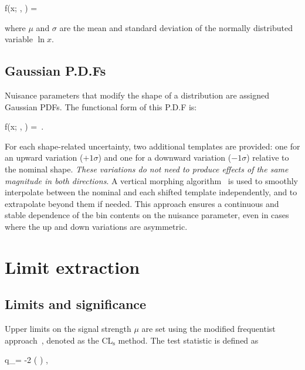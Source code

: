 \begin{equation_pad}
f(x; \mu, \sigma) =  
\exp{}
\end{equation_pad}
where $\mu$ and $\sigma$ are the mean and standard deviation of the normally distributed variable $\ln x$.

\subsection{Gaussian P.D.Fs}  
Nuisance parameters that modify the shape of a distribution are assigned Gaussian PDFs. The functional form of this P.D.F is:

\begin{equation_pad}
f(x; \mu, \sigma) =  
\exp{} \,.
\end{equation_pad}

For each shape-related uncertainty, two additional templates are provided: one for an upward variation ($+1\sigma$) and one for a downward variation ($-1\sigma$) relative to the nominal shape. \textit{These variations do not need to produce effects of the same magnitude in both directions}. A vertical morphing algorithm~\cite{Conway:2011in} is used to smoothly interpolate between the nominal and each shifted template independently, and to extrapolate beyond them if needed. This approach ensures a continuous and stable dependence of the bin contents on the nuisance parameter, even in cases where the up and down variations are asymmetric.

\section{Limit extraction}
\label{Section:Chapter6_LimitExtraction}

\subsection{Limits and significance}

Upper limits on the signal strength $\mu$ are set using the modified frequentist approach~\cite{Junk:1999kv,Read:2002hq}, denoted as the CL$_\mathrm{s}$ method. The test statistic is defined as

\begin{equation_pad}
q_\mu = -2 \ln \left(  \right) \quad ,  \leq \hat{\mu} \leq \mu
\end{equation_pad}

